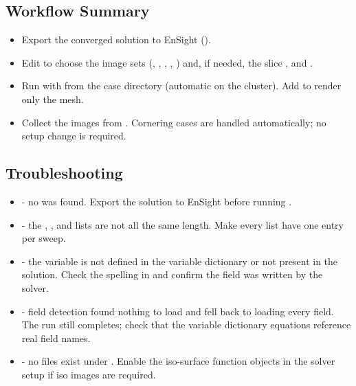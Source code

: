 \subsection{Workflow Summary}
\begin{itemize}
    \item Export the converged solution to EnSight ().

    \item Edit  to choose the image sets (, , , , ) and, if needed, the slice ,  and .

    \item Run  with  from the case directory (automatic on the cluster). Add  to render only the mesh.

    \item Collect the images from . Cornering cases are handled automatically; no setup change is required.
\end{itemize}

\subsection{Troubleshooting}
\begin{itemize}
    \item {} - no  was found. Export the solution to EnSight before running .

    \item {} - the , ,  and  lists are not all the same length. Make every \codeword{[SLICE]} list have one entry per sweep.

    \item {} - the variable is not defined in the variable dictionary or not present in the solution. Check the spelling in  and confirm the field was written by the solver.

    \item {} - field detection found nothing to load and fell back to loading every field. The run still completes; check that the variable dictionary equations reference real field names.

    \item {} - no  files exist under . Enable the iso-surface function objects in the solver setup if iso images are required.
\end{itemize}

